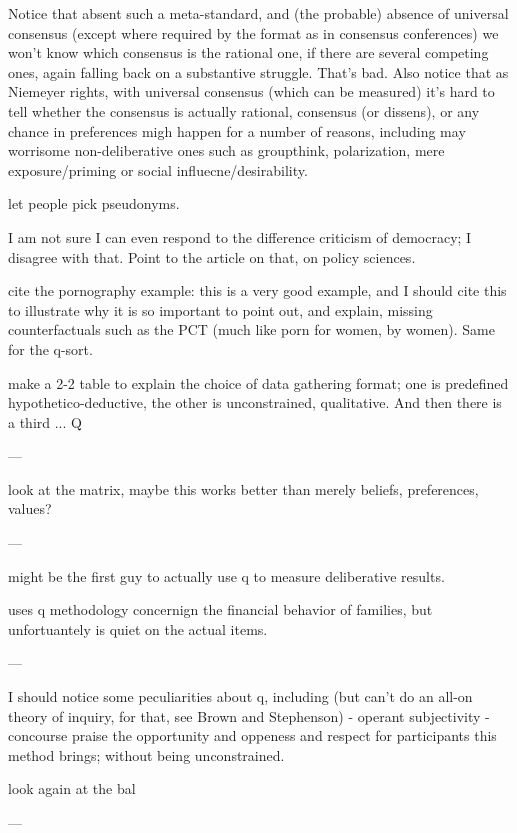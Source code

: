 Notice that absent such a meta-standard, and (the probable) absence of universal consensus (except where required by the format as in consensus conferences) we won't know which consensus is the rational one, if there are several competing ones, again falling back on a substantive struggle.
That's bad.
Also notice that as Niemeyer rights, with universal consensus (which can be measured) it's hard to tell whether the consensus is actually rational, consensus (or dissens), or any chance in preferences migh happen for a number of reasons, including may worrisome non-deliberative ones such as groupthink, polarization, mere exposure/priming or social influecne/desirability.

let people pick pseudonyms.

I am not sure I can even respond to the difference criticism of democracy; I disagree with that.
Point to the article on that, on policy sciences.

cite the pornography example: this is a very good example, and I should cite this to illustrate why it is so important to point out, and explain, missing counterfactuals such as the PCT (much like porn for women, by women).
Same for the q-sort.

make a 2-2 table to explain the choice of data gathering format; one is predefined hypothetico-deductive, the other is unconstrained, qualitative.
And then there is a third ... Q

---

\cite{Ockwell2008}

look at the \cite{Dryzek1993} matrix, maybe this works better than merely beliefs, preferences, values?

---

\cite{Pelletier1999} might be the first guy to actually use q to measure deliberative results.

\cite{price1968} uses q methodology concernign the financial behavior of families, but unfortuantely is quiet on the actual items.

---

I should notice some peculiarities about q, including (but can't do an all-on theory of inquiry, for that, see Brown and Stephenson)
- operant subjectivity
- concourse
praise the opportunity and oppeness and respect for participants this method brings; without being unconstrained.



look again at the bal


---

